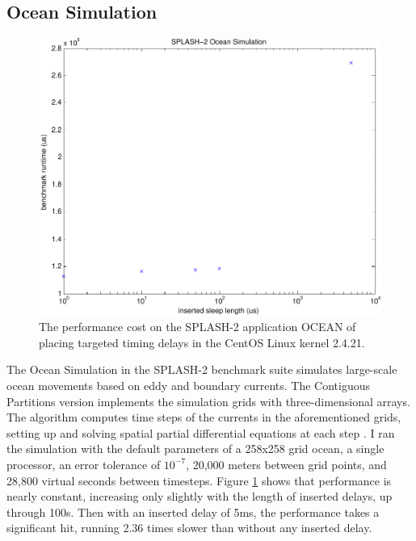\documentclass[letterpaper,twocolumn,10pt]{article}
\begin{document}
\subsection{Ocean Simulation}
\begin{figure}
\centering
\includegraphics[width=\columnwidth]{ocean}
\caption{The performance cost on the SPLASH-2 application OCEAN of placing targeted timing delays in the CentOS Linux kernel 2.4.21.}
\label{fig_ocean}
\end{figure}
The Ocean Simulation in the SPLASH-2 benchmark suite simulates large-scale ocean movements based on eddy and boundary currents.  The Contiguous Partitions version implements the simulation grids with three-dimensional arrays.  The algorithm computes time steps of the currents in the aforementioned grids, setting up and solving spatial partial differential equations at each step \cite{Singh1992}.  I ran the simulation with the default parameters of a 258x258 grid ocean, a single processor, an error tolerance of $10^{-7}$, 20,000 meters between grid points, and 28,800 virtual seconds between timesteps.  Figure \ref{fig_ocean} shows that performance is nearly constant, increasing only slightly with the length of inserted delays, up through 100{\textmu}s.  Then with an inserted delay of 5ms, the performance takes a significant hit, running 2.36 times slower than without any inserted delay.
\end{document}
